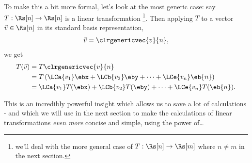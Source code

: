 To make this a bit more formal, let's look at the most generic case: say $T:\Rs[n]\to\Rs[n]$ is a linear transformation \footnote{we'll deal with the more general case of $T:\Rs[n]\to\Rs[m]$ where $n\neq m$ in the next section.}. Then applying $T$ to a vector $\vec{v}\in\Rs[n]$ in its standard basis representation, $$\vec{v}=\clrgenericvec{v}{n},$$ we get
\begin{equation}
	\begin{aligned}
		T(\vec{v}) & = T\clrgenericvec{v}{n}                                                         \\
		           & = T\left( \LCa{v_{1}}\ebx + \LCb{v_{2}}\eby + \dots + \LCe{v_{n}}\eb{n} \right) \\
		           & = \LCa{v_{1}}T(\ebx) + \LCb{v_{2}}T(\eby) + \dots + \LCe{v_{n}}T(\eb{n}).
	\end{aligned}
	\label{eq:}
\end{equation}

This is an incredibly powerful insight which allows us to save a lot of calculations - and which we will use in the next section to make the calculations of linear transformations \textit{even more} concise and simple, using the power of\dots %
